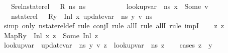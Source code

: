 \begin{isabellebody}
\ \ \ Srel{\isacharcolon}{\kern0pt}{\isachardoublequoteopen}nstate{\isacharunderscore}{\kern0pt}rel\ {\isasymLambda}\ {\isasymLambda}{\isacharprime}{\kern0pt}\ R\ ns{}\ ns{}{\isachardoublequoteclose}\ \isanewline
\ \ \ \ \ \ \ \ \ \ {\isachardoublequoteopen}lookup{\isacharunderscore}{\kern0pt}var\ {\isasymLambda}{\isacharprime}{\kern0pt}\ ns{}\ x\ {\isacharequal}{\kern0pt}\ Some\ v{\isachardoublequoteclose}\isanewline
\ \ \ {\isachardoublequoteopen}nstate{\isacharunderscore}{\kern0pt}rel\ {\isasymLambda}\ {\isasymLambda}{\isacharprime}{\kern0pt}\ {\isacharparenleft}{\kern0pt}R{\isacharparenleft}{\kern0pt}y\ {\isasymmapsto}\ {\isacharparenleft}{\kern0pt}Inl\ x{\isacharparenright}{\kern0pt}{\isacharparenright}{\kern0pt}{\isacharparenright}{\kern0pt}\ {\isacharparenleft}{\kern0pt}update{\isacharunderscore}{\kern0pt}var\ {\isasymLambda}\ ns{}\ y\ v{\isacharparenright}{\kern0pt}\ ns{}{\isachardoublequoteclose}\ \isanewline
%
\isadelimproof
%
\endisadelimproof
%
\isatagproof
{}\isamarkupfalse%
\ {\isacharparenleft}{\kern0pt}simp\ only{\isacharcolon}{\kern0pt}\ nstate{\isacharunderscore}{\kern0pt}rel{\isacharunderscore}{\kern0pt}def{\isacharcomma}{\kern0pt}\ rule\ conjI{\isacharcomma}{\kern0pt}\ rule\ allI{\isacharcomma}{\kern0pt}\ rule\ allI{\isacharcomma}{\kern0pt}\ rule\ impI{\isacharparenright}{\kern0pt}\isanewline
\ \ \isamarkupfalse%
\ z{}\ z{}\isanewline
\ \ \isamarkupfalse%
\ Map{\isacharcolon}{\kern0pt}{\isachardoublequoteopen}{\isacharparenleft}{\kern0pt}R{\isacharparenleft}{\kern0pt}y\ {\isasymmapsto}\ {\isacharparenleft}{\kern0pt}Inl\ x{\isacharparenright}{\kern0pt}{\isacharparenright}{\kern0pt}{\isacharparenright}{\kern0pt}\ z{}\ {\isacharequal}{\kern0pt}\ Some\ {\isacharparenleft}{\kern0pt}Inl\ z{}{\isacharparenright}{\kern0pt}{\isachardoublequoteclose}\isanewline
\ \ \isamarkupfalse%
\ {\isachardoublequoteopen}lookup{\isacharunderscore}{\kern0pt}var\ {\isasymLambda}\ {\isacharparenleft}{\kern0pt}update{\isacharunderscore}{\kern0pt}var\ {\isasymLambda}\ ns{}\ y\ v{\isacharparenright}{\kern0pt}\ z{}\ {\isacharequal}{\kern0pt}\ lookup{\isacharunderscore}{\kern0pt}var\ {\isasymLambda}{\isacharprime}{\kern0pt}\ ns{}\ z{}{\isachardoublequoteclose}\isanewline
\ \ \isamarkupfalse%
\ {\isacharparenleft}{\kern0pt}cases\ {\isachardoublequoteopen}z{}\ {\isacharequal}{\kern0pt}\ y{\isachardoublequoteclose}{\isacharparenright}{\kern0pt}\isanewline

\end{isabellebody}
